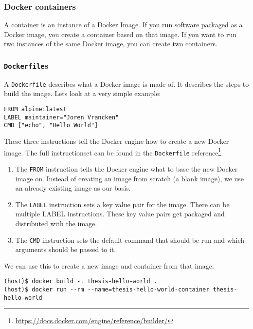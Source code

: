\subsubsection{Docker containers}
A container is an instance of a Docker Image. If you run software packaged as a Docker image, you create a container based on that image. If you want to run two instances of the same Docker image, you can create two containers.

\subsubsection{\lstinline{Dockerfile}s}
A \lstinline{Dockerfile} describes what a Docker image is made of. It describes the steps to build the image. Lets look at a very simple example:

\begin{lstlisting}[caption={Very Basic \lstinline{Dockerfile}},label={dockerfile:simple},captionpos=b]
FROM alpine:latest
LABEL maintainer="Joren Vrancken"
CMD ["echo", "Hello World"]
\end{lstlisting}

These three instructions tell the Docker engine how to create a new Docker image.
The full instructionset can be found in the \lstinline{Dockerfile} reference\footnote{\url{https://docs.docker.com/engine/reference/builder/}}.

\begin{enumerate}
    \item The \lstinline{FROM} instruction tells the Docker engine what to base the new Docker image on. Instead of creating an image from scratch (a blank image), we use an already existing image as our basis.

    \item The \lstinline{LABEL} instruction sets a key value pair for the image. There can be multiple LABEL instructions. These key value pairs get packaged and distributed with the image.

    \item The \lstinline{CMD} instruction sets the default command that should be run and which arguments should be passed to it.
\end{enumerate}

We can use this to create a new image and container from that image.
\begin{lstlisting}[caption={Creating a Docker container from a \lstinline{Dockerfile}},label={docker:container},captionpos=b]
(host)$ docker build -t thesis-hello-world .
(host)$ docker run --rm --name=thesis-hello-world-container thesis-hello-world
\end{lstlisting}

